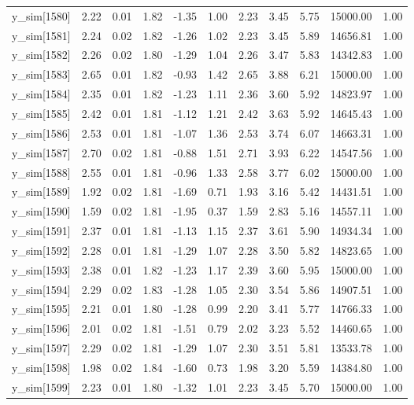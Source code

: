 \begin{table}[ht]
\begin{tabular}{rrrrrrrrrrr}
  y\_sim[1580] & 2.22 & 0.01 & 1.82 & -1.35 & 1.00 & 2.23 & 3.45 & 5.75 & 15000.00 & 1.00 \\ 
  y\_sim[1581] & 2.24 & 0.02 & 1.82 & -1.26 & 1.02 & 2.23 & 3.45 & 5.89 & 14656.81 & 1.00 \\ 
  y\_sim[1582] & 2.26 & 0.02 & 1.80 & -1.29 & 1.04 & 2.26 & 3.47 & 5.83 & 14342.83 & 1.00 \\ 
  y\_sim[1583] & 2.65 & 0.01 & 1.82 & -0.93 & 1.42 & 2.65 & 3.88 & 6.21 & 15000.00 & 1.00 \\ 
  y\_sim[1584] & 2.35 & 0.01 & 1.82 & -1.23 & 1.11 & 2.36 & 3.60 & 5.92 & 14823.97 & 1.00 \\ 
  y\_sim[1585] & 2.42 & 0.01 & 1.81 & -1.12 & 1.21 & 2.42 & 3.63 & 5.92 & 14645.43 & 1.00 \\ 
  y\_sim[1586] & 2.53 & 0.01 & 1.81 & -1.07 & 1.36 & 2.53 & 3.74 & 6.07 & 14663.31 & 1.00 \\ 
  y\_sim[1587] & 2.70 & 0.02 & 1.81 & -0.88 & 1.51 & 2.71 & 3.93 & 6.22 & 14547.56 & 1.00 \\ 
  y\_sim[1588] & 2.55 & 0.01 & 1.81 & -0.96 & 1.33 & 2.58 & 3.77 & 6.02 & 15000.00 & 1.00 \\ 
  y\_sim[1589] & 1.92 & 0.02 & 1.81 & -1.69 & 0.71 & 1.93 & 3.16 & 5.42 & 14431.51 & 1.00 \\ 
  y\_sim[1590] & 1.59 & 0.02 & 1.81 & -1.95 & 0.37 & 1.59 & 2.83 & 5.16 & 14557.11 & 1.00 \\ 
  y\_sim[1591] & 2.37 & 0.01 & 1.81 & -1.13 & 1.15 & 2.37 & 3.61 & 5.90 & 14934.34 & 1.00 \\ 
  y\_sim[1592] & 2.28 & 0.01 & 1.81 & -1.29 & 1.07 & 2.28 & 3.50 & 5.82 & 14823.65 & 1.00 \\ 
  y\_sim[1593] & 2.38 & 0.01 & 1.82 & -1.23 & 1.17 & 2.39 & 3.60 & 5.95 & 15000.00 & 1.00 \\ 
  y\_sim[1594] & 2.29 & 0.02 & 1.83 & -1.28 & 1.05 & 2.30 & 3.54 & 5.86 & 14907.51 & 1.00 \\ 
  y\_sim[1595] & 2.21 & 0.01 & 1.80 & -1.28 & 0.99 & 2.20 & 3.41 & 5.77 & 14766.33 & 1.00 \\ 
  y\_sim[1596] & 2.01 & 0.02 & 1.81 & -1.51 & 0.79 & 2.02 & 3.23 & 5.52 & 14460.65 & 1.00 \\ 
  y\_sim[1597] & 2.29 & 0.02 & 1.81 & -1.29 & 1.07 & 2.30 & 3.51 & 5.81 & 13533.78 & 1.00 \\ 
  y\_sim[1598] & 1.98 & 0.02 & 1.84 & -1.60 & 0.73 & 1.98 & 3.20 & 5.59 & 14384.80 & 1.00 \\ 
  y\_sim[1599] & 2.23 & 0.01 & 1.80 & -1.32 & 1.01 & 2.23 & 3.45 & 5.70 & 15000.00 & 1.00 \\ 

\end{tabular}
\end{table}
